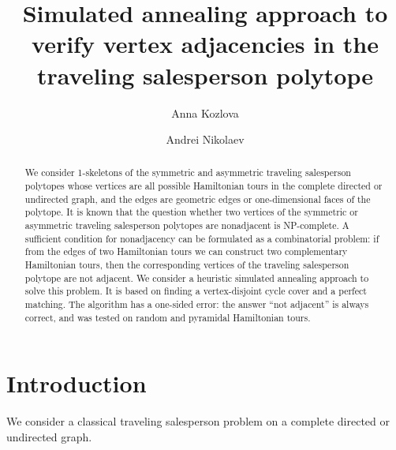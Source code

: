 \documentclass[runningheads]{llncs}
\begin{document}
%
\title{Simulated annealing approach to verify vertex adjacencies in the traveling salesperson polytope}
%
%
\author{Anna Kozlova \and
Andrei Nikolaev}
%
%
%
\maketitle              %
%
\begin{abstract}
We consider 1-skeletons of the symmetric and asymmetric traveling salesperson polytopes whose vertices are all possible Hamiltonian tours in the complete directed or undirected graph, and the edges are geometric edges or one-dimensional faces of the polytope.
It is known that the question whether two vertices of the symmetric or asymmetric traveling salesperson polytopes are nonadjacent is NP-complete.
A sufficient condition for nonadjacency can be formulated as a combinatorial problem: if from the edges of two Hamiltonian tours we can construct two complementary Hamiltonian tours, then the corresponding vertices of the traveling salesperson polytope are not adjacent. 
We consider a heuristic simulated annealing approach to solve this problem. It is based on finding a vertex-disjoint cycle cover and a perfect matching.
The algorithm has a one-sided error: the answer ``not adjacent'' is always correct, and was tested on random and pyramidal Hamiltonian tours.


\end{abstract}
%
%
%

\section{Introduction} %

We consider a classical traveling salesperson problem on a complete directed or undirected graph. 
\end{document}
